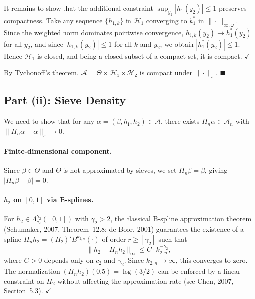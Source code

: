 \documentclass[12pt]{article}
\begin{document}
It remains to show that the additional constraint $\sup_{y_2}|h_1(y_2)| \leq 1$ preserves compactness. Take any sequence $\{h_{1,k}\}$ in $\mathcal{H}_1$ converging to $h_1^*$ in $\|\cdot\|_{\infty,\omega}$. Since the weighted norm dominates pointwise convergence, $h_{1,k}(y_2) \to h_1^*(y_2)$ for all $y_2$, and since $|h_{1,k}(y_2)| \leq 1$ for all $k$ and $y_2$, we obtain $|h_1^*(y_2)| \leq 1$. Hence $\mathcal{H}_1$ is closed, and being a closed subset of a compact set, it is compact. \hfill $\checkmark$

\bigskip
By Tychonoff's theorem, $\mathcal{A} = \Theta \times \mathcal{H}_1 \times \mathcal{H}_2$ is compact under $\|\cdot\|_s$. \hfill $\blacksquare$


\subsection{Part (ii): Sieve Density}

We need to show that for any $\alpha = (\beta, h_1, h_2) \in \mathcal{A}$, there exists $\Pi_n \alpha \in \mathcal{A}_n$ with $\|\Pi_n \alpha - \alpha\|_s \to 0$.

\paragraph{Finite-dimensional component.} Since $\beta \in \Theta$ and $\Theta$ is not approximated by sieves, we set $\Pi_n \beta = \beta$, giving $|\Pi_n \beta - \beta| = 0$.

\paragraph{$h_2$ on $[0,1]$ via B-splines.}
For $h_2 \in \Lambda_{c_2}^{\gamma_2}([0,1])$ with $\gamma_2 > 2$, the classical B-spline approximation theorem (Schumaker, 2007, Theorem~12.8; de Boor, 2001) guarantees the existence of a spline $\Pi_n h_2 = (\Pi_2)' B^{k_{2,n}}(\cdot)$ of order $r \geq [\gamma_2]$ such that
\begin{equation}\label{eq:h2rate}
\|h_2 - \Pi_n h_2\|_\infty \leq C \cdot k_{2,n}^{-\gamma_2},
\end{equation}
where $C > 0$ depends only on $c_2$ and $\gamma_2$. Since $k_{2,n} \to \infty$, this converges to zero. The normalization $(\Pi_n h_2)(0.5) = \log(3/2)$ can be enforced by a linear constraint on $\Pi_2$ without affecting the approximation rate (see Chen, 2007, Section~5.3). \hfill $\checkmark$
\end{document}
